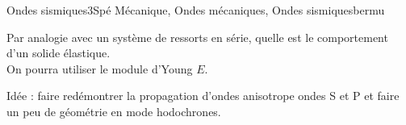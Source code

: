 
\begin{exercise}{Ondes sismiques}{3}{Spé}
{Mécanique, Ondes mécaniques, Ondes sismiques}{bermu}

\begin{questions}
    \questioncours Par analogie avec un système de ressorts en série, quelle est le comportement d'un solide élastique. \\
    On pourra utiliser le module d'Young $E$.
\end{questions}

Idée : faire redémontrer la propagation d'ondes anisotrope ondes S et P et faire un peu de géométrie en mode hodochrones.

\end{exercise}